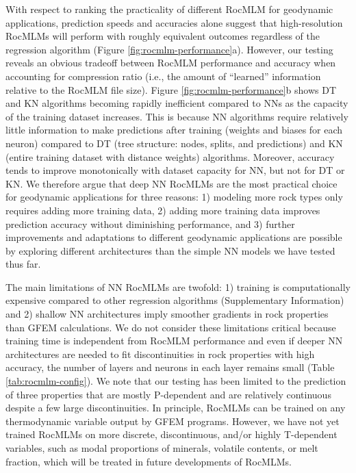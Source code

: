 \documentclass[draft,linenumbers]{agujournal2018}
\begin{document}
With respect to ranking the practicality of different RocMLM for geodynamic applications, prediction speeds and accuracies alone suggest that high-resolution RocMLMs will perform with roughly equivalent outcomes regardless of the regression algorithm (Figure \ref{fig:rocmlm-performance}a). However, our testing reveals an obvious tradeoff between RocMLM performance and accuracy when accounting for compression ratio (i.e., the amount of ``learned'' information relative to the RocMLM file size). Figure \ref{fig:rocmlm-performance}b shows DT and KN algorithms becoming rapidly inefficient compared to NNs as the capacity of the training dataset increases. This is because NN algorithms require relatively little information to make predictions after training (weights and biases for each neuron) compared to DT (tree structure: nodes, splits, and predictions) and KN (entire training dataset with distance weights) algorithms. Moreover, accuracy tends to improve monotonically with dataset capacity for NN, but not for DT or KN. We therefore argue that deep NN RocMLMs are the most practical choice for geodynamic applications for three reasons: 1) modeling more rock types only requires adding more training data, 2) adding more training data improves prediction accuracy without diminishing performance, and 3) further improvements and adaptations to different geodynamic applications are possible by exploring different architectures than the simple NN models we have tested thus far.

The main limitations of NN RocMLMs are twofold: 1) training is computationally expensive compared to other regression algorithms (Supplementary Information) and 2) shallow NN architectures imply smoother gradients in rock properties than GFEM calculations. We do not consider these limitations critical because training time is independent from RocMLM performance and even if deeper NN architectures are needed to fit discontinuities in rock properties with high accuracy, the number of layers and neurons in each layer remains small (Table \ref{tab:rocmlm-config}). We note that our testing has been limited to the prediction of three properties that are mostly P-dependent and are relatively continuous despite a few large discontinuities. In principle, RocMLMs can be trained on any thermodynamic variable output by GFEM programs. However, we have not yet trained RocMLMs on more discrete, discontinuous, and/or highly T-dependent variables, such as modal proportions of minerals, volatile contents, or melt fraction, which will be treated in future developments of RocMLMs.
\end{document}

